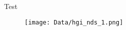 \documentclass{article}
\begin{document}
Test
\begin{figure}
\centering
\texttt{[image: Data/hgi\_nds\_1.png]} 
\label{fig:1}
\end{figure}
\end{document}
